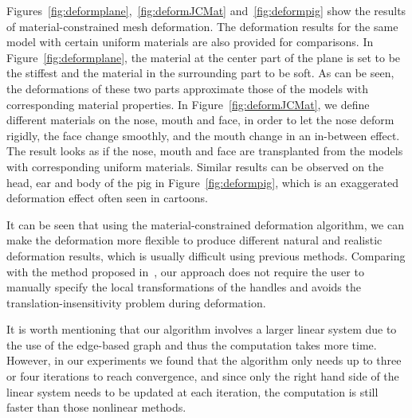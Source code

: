 Figures~\ref{fig:deformplane},~\ref{fig:deformJCMat}
and~\ref{fig:deformpig}  show the results of material-constrained
mesh deformation. The deformation results for the same model with
certain uniform materials are also provided for comparisons. In
Figure~\ref{fig:deformplane}, the material at the center part of the
plane is set to be the stiffest and the material in the surrounding
part to be soft. As can be seen, the deformations of these two parts
approximate those of the models with corresponding material
properties. In Figure~\ref{fig:deformJCMat}, we define different
materials on the nose, mouth and face, in order to let the nose
deform rigidly, the face change smoothly, and the mouth change in an
in-between effect. The result looks as if the nose, mouth and face
are transplanted from the models with corresponding uniform
materials. Similar results can be observed on the head, ear and body
of the pig in Figure~\ref{fig:deformpig}, which is an exaggerated
deformation effect often seen in cartoons.

It can be seen that using the  material-constrained deformation
algorithm, we can make the deformation more flexible to produce
different natural and realistic deformation results, which is
usually difficult using previous methods. Comparing with the method
proposed in~\cite{PJS05}, our approach does not require the user to
manually specify the local transformations of the handles and avoids
the translation-insensitivity problem during deformation.

It is worth mentioning that our algorithm  involves a larger linear
system due to the use of the edge-based graph and thus the
computation takes more time. However, in our experiments we found
that the algorithm only needs up to three or four iterations  to
reach convergence, and since only the right hand side of the linear
system needs to be updated at each iteration, the computation is
still  faster than those nonlinear methods.


